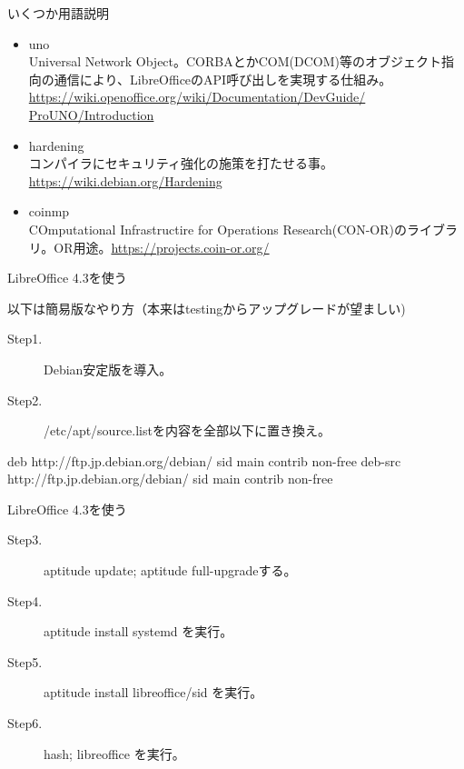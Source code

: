 \begin{frame}{いくつか用語説明}

 \begin{itemize}
 \item uno\\
 Universal Network Object。CORBAとかCOM(DCOM)等のオブジェクト指向の通信により、LibreOfficeのAPI呼び出しを実現する仕組み。
 \url{https://wiki.openoffice.org/wiki/Documentation/DevGuide/ ProUNO/Introduction}
 \item hardening\\
 コンパイラにセキュリティ強化の施策を打たせる事。\url{https://wiki.debian.org/Hardening}
 \item coinmp \\
  COmputational Infrastructire for Operations Research(CON-OR)のライブラリ。OR用途。\url{https://projects.coin-or.org/}
 \end{itemize}
\end{frame}

\begin{frame}[containsverbatim]{LibreOffice 4.3を使う}

 以下は簡易版なやり方（本来はtestingからアップグレードが望ましい)
 \begin{description}
 \item [Step1.]  Debian安定版を導入。
　\item [Step2.]  /etc/apt/source.listを内容を全部以下に置き換え。
 \end{description}

 \begin{commandlinesmall}
deb http://ftp.jp.debian.org/debian/ sid main contrib non-free
deb-src http://ftp.jp.debian.org/debian/ sid main contrib non-free
 \end{commandlinesmall}

\end{frame}

\begin{frame}{LibreOffice 4.3を使う}

 \begin{description}
 \item [Step3.]  aptitude update; aptitude full-upgradeする。
　\item [Step4.]  aptitude install systemd を実行。
  \item [Step5.]  aptitude install libreoffice/sid を実行。
  \item [Step6.]  hash; libreoffice を実行。
 \end{description}
\end{frame}

